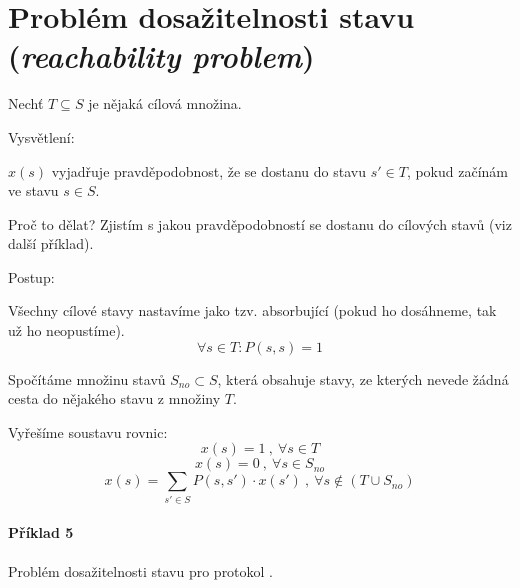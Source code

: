 
\section{Problém dosažitelnosti stavu (\textit{reachability problem})}

\begin{compactitem}
    \item Nechť $T \subseteq S$ je nějaká cílová množina.


    \item Vysvětlení: \begin{compactitem}
        \item $x(s)$ vyjadřuje pravděpodobnost, že se dostanu do stavu $s' \in T$, pokud začínám ve stavu $s \in S$.
    \end{compactitem}

    \item Proč to dělat? Zjistím s jakou pravděpodobností se dostanu do cílových stavů (viz další příklad).

    \item Postup: \begin{compactenum}
        \item Všechny cílové stavy nastavíme jako tzv. absorbující (pokud ho dosáhneme, tak už ho neopustíme).
        $$ \forall s \in T : P(s, s) = 1 $$

        \item Spočítáme množinu stavů $S_{no} \subset S$, která obsahuje stavy, ze kterých nevede žádná cesta do nějakého stavu z množiny $T$.

        \item Vyřešíme soustavu rovnic:
        $$ x(s) = 1 ~,~ \forall s \in T $$
        $$ x(s) = 0 ~,~ \forall s \in S_{no} $$
        $$ x(s) = \sum_{s' \in S} P(s, s') \cdot x(s') ~,~ \forall s \not\in (T \cup S_{no}) $$

    \end{compactenum}
\end{compactitem}

\paragraph*{Příklad 5} Problém dosažitelnosti stavu pro protokol .

